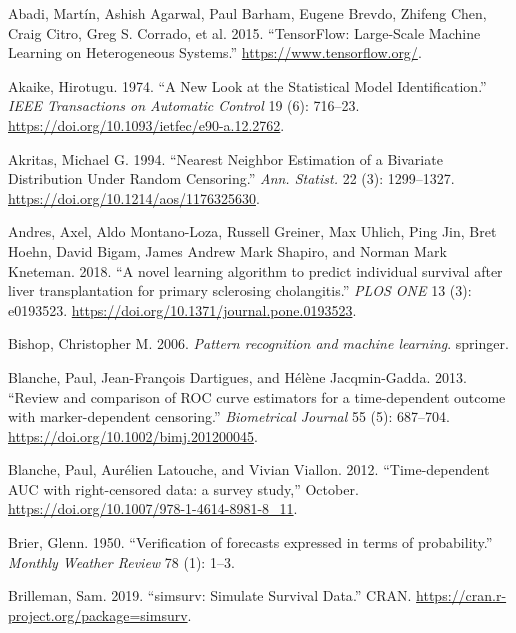\documentclass[
  letterpaper,
]{scrbook}
\newlength{\cslhangindent}
\newlength{\cslentryspacingunit} %
\newenvironment{CSLReferences}[2] %
 {%
  \setlength{\parindent}{0pt}
  \ifodd #1
  \let\oldpar\par
  \def\par{\hangindent=\cslhangindent\oldpar}
  \fi
  \setlength{\parskip}{#2\cslentryspacingunit}
 }%
 {}
\theoremstyle{plain}
\theoremstyle{definition}
\theoremstyle{remark}
\begin{document}
\hypertarget{refs}{}
\begin{CSLReferences}{1}{0}
\leavevmode{}%
Abadi, Martín, Ashish Agarwal, Paul Barham, Eugene Brevdo, Zhifeng Chen,
Craig Citro, Greg S. Corrado, et al. 2015. {``{TensorFlow: Large-Scale
Machine Learning on Heterogeneous Systems}.''}
\url{https://www.tensorflow.org/}.

\leavevmode{}%
Akaike, Hirotugu. 1974. {``{A New Look at the Statistical Model
Identification}.''} \emph{IEEE Transactions on Automatic Control} 19
(6): 716--23. \url{https://doi.org/10.1093/ietfec/e90-a.12.2762}.

\leavevmode{}%
Akritas, Michael G. 1994. {``{Nearest Neighbor Estimation of a Bivariate
Distribution Under Random Censoring}.''} \emph{Ann. Statist.} 22 (3):
1299--1327. \url{https://doi.org/10.1214/aos/1176325630}.

\leavevmode{}%
Andres, Axel, Aldo Montano-Loza, Russell Greiner, Max Uhlich, Ping Jin,
Bret Hoehn, David Bigam, James Andrew Mark Shapiro, and Norman Mark
Kneteman. 2018. {``{A novel learning algorithm to predict individual
survival after liver transplantation for primary sclerosing
cholangitis}.''} \emph{PLOS ONE} 13 (3): e0193523.
\url{https://doi.org/10.1371/journal.pone.0193523}.

\leavevmode{}%
Bishop, Christopher M. 2006. \emph{{Pattern recognition and machine
learning}}. springer.

\leavevmode{}%
Blanche, Paul, Jean-François Dartigues, and Hélène Jacqmin-Gadda. 2013.
{``{Review and comparison of ROC curve estimators for a time-dependent
outcome with marker-dependent censoring}.''} \emph{Biometrical Journal}
55 (5): 687--704. \url{https://doi.org/10.1002/bimj.201200045}.

\leavevmode{}%
Blanche, Paul, Aurélien Latouche, and Vivian Viallon. 2012.
{``{Time-dependent AUC with right-censored data: a survey study},''}
October. \url{https://doi.org/10.1007/978-1-4614-8981-8_11}.

\leavevmode{}%
Brier, Glenn. 1950. {``{Verification of forecasts expressed in terms of
probability}.''} \emph{Monthly Weather Review} 78 (1): 1--3.

\leavevmode{}%
Brilleman, Sam. 2019. {``{simsurv: Simulate Survival Data}.''} CRAN.
\url{https://cran.r-project.org/package=simsurv}.


\end{CSLReferences}
\end{document}
